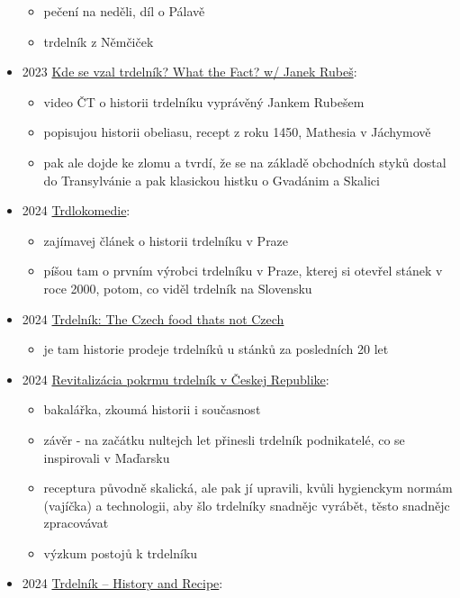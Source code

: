 \begin{itemize}
  \begin{itemize}
  \tightlist
  \item
    pečení na neděli, díl o Pálavě
  \item
    trdelník z Němčiček
  \end{itemize}
\item
  2023 \href{https://www.youtube.com/watch?v=MPNEFr6O-Dw}{Kde se vzal
  trdelník? What the Fact? w/ Janek Rubeš}:

  \begin{itemize}
  \tightlist
  \item
    video ČT o historii trdelníku vyprávěný Jankem Rubešem
  \item
    popisujou historii obeliasu, recept z roku 1450, Mathesia v
    Jáchymově
  \item
    pak ale dojde ke zlomu a tvrdí, že se na základě obchodních styků
    dostal do Transylvánie a pak klasickou histku o Gvadánim a Skalici
  \end{itemize}
\item
  2024
  \href{https://reportermagazin.cz/79410/trdlokomedie-lukrativni-byznys-tahanice-a-tezke-vahy-v-pozadi/}{Trdlokomedie}:

  \begin{itemize}
  \tightlist
  \item
    zajímavej článek o historii trdelníku v Praze
  \item
    píšou tam o prvním výrobci trdelníku v Praze, kterej si otevřel
    stánek v roce 2000, potom, co viděl trdelník na Slovensku
  \end{itemize}
\item
  2024
  \href{https://www.bbc.com/travel/article/20241014-trdelnik-the-czech-food-thats-not-czech}{Trdelník:
  The Czech food that\textquotesingle s not Czech}

  \begin{itemize}
  \tightlist
  \item
    je tam historie prodeje trdelníků u stánků za posledních 20 let
  \end{itemize}
\item
  2024
  \href{https://is.muni.cz/th/livm9/Bakalarska_praca.pdf}{Revitalizácia
  pokrmu trdelník v Českej Republike}:

  \begin{itemize}
  \tightlist
  \item
    bakalářka, zkoumá historii i současnost
  \item
    závěr - na začátku nultejch let přinesli trdelník podnikatelé, co se
    inspirovali v Maďarsku
  \item
    receptura původně skalická, ale pak jí upravili, kvůli hygienckym
    normám (vajíčka) a technologii, aby šlo trdelníky snadnějc vyrábět,
    těsto snadnějc zpracovávat
  \item
    výzkum postojů k trdelníku
  \end{itemize}
\item
  2024
  \href{https://www.czechology.com/trdelnik-history-and-recipe/}{Trdelník
  -- History and Recipe}:


\end{itemize}
